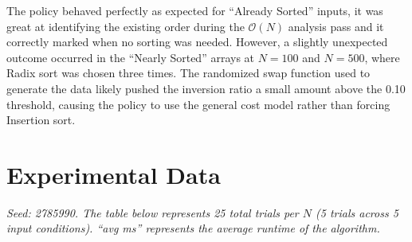 \documentclass{article}
\begin{document}
The policy behaved perfectly as expected for ``Already Sorted'' inputs, it was great at identifying the existing order during the $\mathcal{O}(N)$ analysis pass and it correctly marked when no sorting was needed. However, a slightly unexpected outcome occurred in the ``Nearly Sorted'' arrays at $N=100$ and $N=500$, where Radix sort was chosen three times. The randomized swap function used to generate the data likely pushed the inversion ratio a small amount above the 0.10 threshold, causing the policy to use the general cost model rather than forcing Insertion sort.

\newpage
\section{Experimental Data}
\textit{Seed: 2785990. The table below represents 25 total trials per $N$ (5 trials across 5 input conditions). ``avg ms'' represents the average runtime of the algorithm.}
\end{document}
